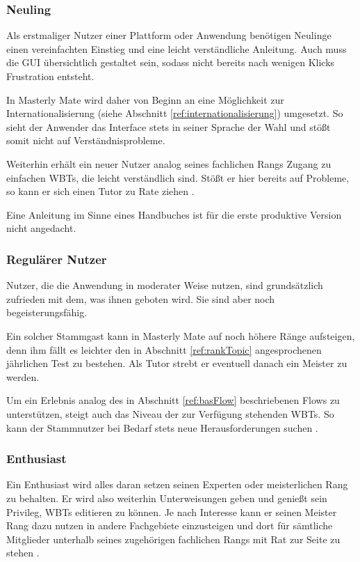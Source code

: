 \subsubsection{Neuling}
Als erstmaliger Nutzer einer Plattform oder Anwendung benötigen Neulinge einen
vereinfachten Einstieg und eine leicht verständliche Anleitung. Auch muss die
GUI übersichtlich gestaltet sein, sodass nicht bereits nach wenigen Klicks
Frustration entsteht.

In Masterly Mate wird daher von Beginn an eine Möglichkeit zur
Internationalisierung (siehe Abschnitt \ref{ref:internationalisierung})
umgesetzt. So sieht der Anwender das Interface stets in seiner Sprache der Wahl
und stößt somit nicht auf Verständnisprobleme.

Weiterhin erhält ein neuer Nutzer analog seines fachlichen Rangs Zugang zu
einfachen WBTs, die leicht verständlich sind. Stößt er hier bereits auf
Probleme, so kann er sich einen Tutor zu Rate ziehen
\cite{grubenMerkeBabics:2012}.

Eine Anleitung im Sinne eines Handbuches ist für die erste produktive Version
nicht angedacht.
  
\subsubsection{Regulärer Nutzer}
Nutzer, die die Anwendung in moderater Weise nutzen, sind grundsätzlich
zufrieden mit dem, was ihnen geboten wird. Sie sind aber noch
begeisterungsfähig.

Ein solcher Stammgast kann in Masterly Mate auf noch höhere Ränge aufsteigen,
denn ihm fällt es leichter den in Abschnitt \ref{ref:rankTopic} angesprochenen
jährlichen Test zu bestehen. Als Tutor strebt er eventuell danach ein Meister zu
werden.

Um ein Erlebnis analog des in Abschnitt \ref{ref:basFlow} beschriebenen Flows zu
unterstützen, steigt auch das Niveau der zur Verfügung stehenden WBTs. So kann
der Stammnutzer bei Bedarf stets neue Herausforderungen suchen
\cite{grubenMerkeBabics:2012}.

\subsubsection{Enthusiast}
Ein Enthusiast wird alles daran setzen seinen Experten oder meisterlichen Rang
zu behalten. Er wird also weiterhin Unterweisungen geben und genießt sein
Privileg, WBTs editieren zu können. Je nach Interesse kann er seinen Meister
Rang dazu nutzen in andere Fachgebiete einzusteigen und dort für sämtliche
Mitglieder unterhalb seines zugehörigen fachlichen Rangs mit Rat zur Seite zu
stehen \cite{grubenMerkeBabics:2012}.

